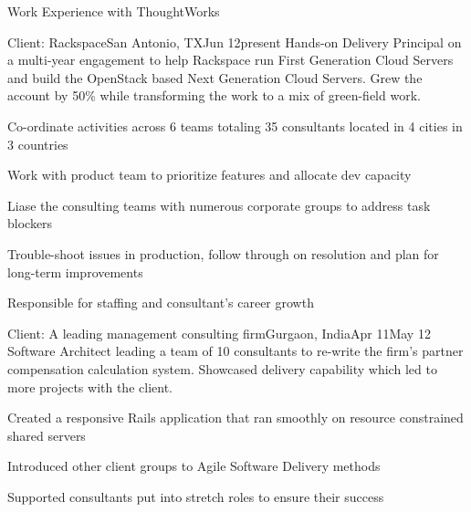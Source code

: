 \documentclass{resume} %
\begin{document}
\vspace{1em}



\begin{rSection}{Work Experience with ThoughtWorks}

\begin{rSubsection}{Client: Rackspace}{San Antonio, TX}{Jun
    12}{present}
{Hands-on Delivery Principal on a multi-year engagement to help Rackspace run
  First Generation Cloud Servers and build the OpenStack based Next
  Generation Cloud Servers. Grew the account by 50\% while
  transforming the work to a mix of green-field work.}

\item Co-ordinate activities across 6 teams
  totaling 35 consultants located in 4 cities in 3 countries
\item Work with product team to prioritize features and allocate dev capacity
\item Liase the consulting teams with numerous corporate groups to address task blockers
\item Trouble-shoot issues in production, follow
  through on resolution and plan for long-term improvements
\item Responsible for staffing and consultant's career growth
\end{rSubsection}


\begin{rSubsection}{Client: A leading management consulting
    firm}{Gurgaon, India}{Apr 11}{May 12}
{Software Architect leading a team of 10 consultants to re-write the
  firm's partner compensation calculation system. Showcased delivery
  capability which led to more projects with the client.}

\item Created a responsive Rails application that ran smoothly on resource constrained shared servers
\item Introduced other client groups to Agile Software Delivery
  methods
\item Supported consultants put into stretch roles to ensure their
  success
\end{rSubsection}



\end{rSection}
\end{document}
